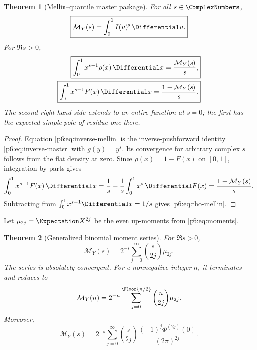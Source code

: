 \documentclass[11pt]{article}
\newtheorem{theorem}{Theorem}[section]
\theoremstyle{definition}
\theoremstyle{remark}
\begin{document}
\begin{theorem}[Mellin--quantile master package]
\label{p6:thm:mellin-master}
For all \(s\in\ComplexNumbers\),
\begin{equation}
\boxed{
 \mathcal M_Y(s)=\int_0^1 I(u)^s\,\Differential u.}                  \label{p6:eq:inverse-mellin}
\end{equation}
For \(\Re s>0\),
\begin{align}
 \boxed{
 \int_0^1x^{s-1}\rho(x)\,\Differential x
 =\frac{\mathcal M_Y(s)}s,}                               \label{p6:eq:rho-mellin}\\
 \boxed{
 \int_0^1x^{s-1}F(x)\,\Differential x
 =\frac{1-\mathcal M_Y(s)}s.}                             \label{p6:eq:F-mellin}
\end{align}
The second right-hand side extends to an entire function at \(s=0\); the first has the
expected simple pole of residue one there.
\end{theorem}

\begin{proof}
Equation \eqref{p6:eq:inverse-mellin} is the inverse-pushforward identity
\eqref{p6:eq:inverse-master} with \(g(y)=y^s\).  Its convergence for arbitrary complex
\(s\) follows from the flat density at zero.  Since \(\rho(x)=1-F(x)\) on \([0,1]\),
integration by parts gives
\[
 \int_0^1x^{s-1}F(x)\,\Differential x
 =\frac1s-\frac1s\int_0^1x^s\,\Differential F(x)
 =\frac{1-\mathcal M_Y(s)}s.
\]
Subtracting from \(\int_0^1x^{s-1}\Differential x=1/s\) gives
\eqref{p6:eq:rho-mellin}.
\end{proof}

Let \(\mu_{2j}=\Expectation X^{2j}\) be the even up-moments from \eqref{p6:eq:moments}.

\begin{theorem}[Generalized binomial moment series]
\label{p6:thm:mellin-binomial}
For \(\Re s>0\),
\begin{equation}
\boxed{
 \mathcal M_Y(s)
 =2^{-s}\sum_{j=0}^{\infty}\binom{s}{2j}\mu_{2j}.}         \label{p6:eq:MY-binomial}
\end{equation}
The series is absolutely convergent.  For a nonnegative integer \(n\), it terminates and
reduces to
\begin{equation}
 \mathcal M_Y(n)=2^{-n}
 \sum_{j=0}^{\Floor{n/2}}\binom n{2j}\mu_{2j}.      \label{p6:eq:MY-integer}
\end{equation}
Moreover,
\begin{equation}
 \mathcal M_Y(s)
 =2^{-s}\sum_{j=0}^{\infty}\binom{s}{2j}
 \frac{(-1)^j\Phi^{(2j)}(0)}{(2\pi)^{2j}}.                 \label{p6:eq:MY-Fourier-jet}
\end{equation}
\end{theorem}
\end{document}
